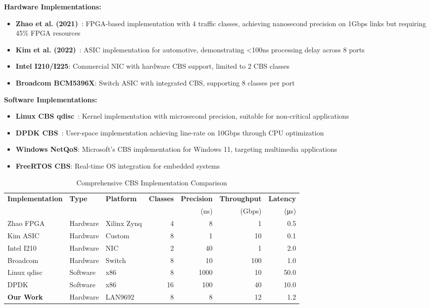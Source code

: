 \documentclass[10pt, journal, compsoc]{IEEEtran}
\begin{document}
\textbf{Hardware Implementations:}
\begin{itemize}
    \item \textbf{Zhao et al. (2021)}~\cite{zhao2020timing}: FPGA-based implementation with 4 traffic classes, achieving nanosecond precision on 1Gbps links but requiring 45\% FPGA resources
    \item \textbf{Kim et al. (2022)}~\cite{kim2021hardware}: ASIC implementation for automotive, demonstrating <100ns processing delay across 8 ports
    \item \textbf{Intel I210/I225}: Commercial NIC with hardware CBS support, limited to 2 CBS classes
    \item \textbf{Broadcom BCM5396X}: Switch ASIC with integrated CBS, supporting 8 classes per port
\end{itemize}

\textbf{Software Implementations:}
\begin{itemize}
    \item \textbf{Linux CBS qdisc}~\cite{linux2023cbs}: Kernel implementation with microsecond precision, suitable for non-critical applications
    \item \textbf{DPDK CBS}~\cite{zhang2022dpdk}: User-space implementation achieving line-rate on 10Gbps through CPU optimization
    \item \textbf{Windows NetQoS}: Microsoft's CBS implementation for Windows 11, targeting multimedia applications
    \item \textbf{FreeRTOS CBS}: Real-time OS integration for embedded systems
\end{itemize}

\begin{table}[h]
\centering
\caption{Comprehensive CBS Implementation Comparison}
\label{tab:cbs_implementations}
\begin{tabular}{lllrrrr}
\toprule
\textbf{Implementation} & \textbf{Type} & \textbf{Platform} & \textbf{Classes} & \textbf{Precision} & \textbf{Throughput} & \textbf{Latency} \\
 & & & & (ns) & (Gbps) & (μs) \\
\midrule
Zhao FPGA & Hardware & Xilinx Zynq & 4 & 8 & 1 & 0.5 \\
Kim ASIC & Hardware & Custom & 8 & 1 & 10 & 0.1 \\
Intel I210 & Hardware & NIC & 2 & 40 & 1 & 2.0 \\
Broadcom & Hardware & Switch & 8 & 10 & 100 & 1.0 \\
Linux qdisc & Software & x86 & 8 & 1000 & 10 & 50.0 \\
DPDK & Software & x86 & 16 & 100 & 40 & 10.0 \\
\textbf{Our Work} & Hardware & LAN9692 & 8 & 8 & 12 & 1.2 \\
\bottomrule
\end{tabular}
\end{table}
\end{document}
